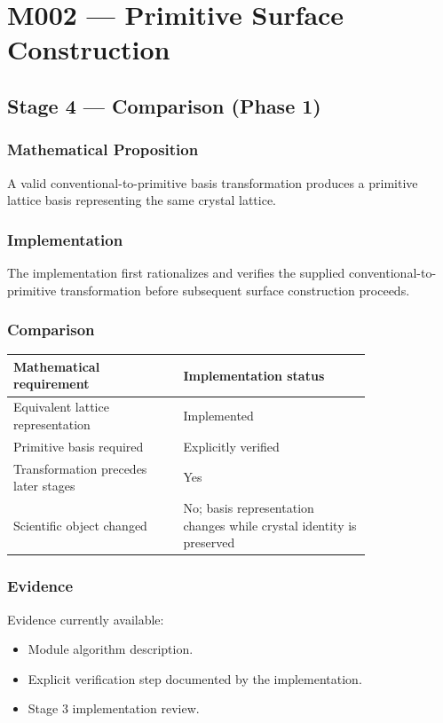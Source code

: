 
\chapter{M002 --- Primitive Surface Construction}

\section{Stage 4 --- Comparison (Phase 1)}

\subsection{Mathematical Proposition}

A valid conventional-to-primitive basis transformation produces a
primitive lattice basis representing the same crystal lattice.

\subsection{Implementation}

The implementation first rationalizes and verifies the supplied
conventional-to-primitive transformation before subsequent surface
construction proceeds.

\subsection{Comparison}

\begin{tabular}{|p{0.38\linewidth}|p{0.42\linewidth}|}
\hline
Mathematical requirement & Implementation status\\
\hline
Equivalent lattice representation & Implemented\\
Primitive basis required & Explicitly verified\\
Transformation precedes later stages & Yes\\
Scientific object changed & No; basis representation changes while crystal identity is preserved\\
\hline
\end{tabular}

\subsection{Evidence}

Evidence currently available:

\begin{itemize}
\item Module algorithm description.
\item Explicit verification step documented by the implementation.
\item Stage 3 implementation review.
\end{itemize}

